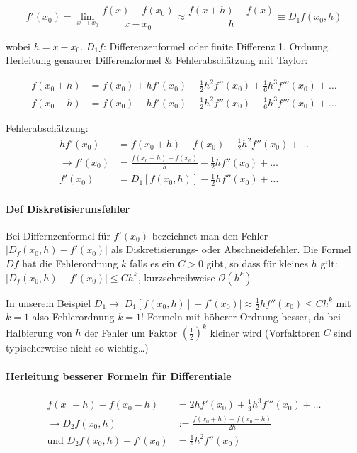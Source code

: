 \documentclass[a4paper,ngerman]{scrbook}
\newcommand{\bO}{\ensuremath{\mathcal{O}}}%
\begin{document}
\[
f'(x_0) = \lim\limits_{x\to x_0} \frac{f(x) - f(x_0)}{x-x_0} \approx \frac{f(x+h) - f(x)}{h} \equiv D_1f(x_0,h)
\]

 wobei $h = x - x_0$. $D_1f$: Differenzenformel oder finite Differenz 1\@. Ordnung. Herleitung genaurer Differenzformel \& Fehlerabschätzung mit Taylor:

\begin{align*}
  f(x_0 + h) &= f(x_0) + hf'(x_0) + \frac{1}{2} h^2 f''(x_0) +     \frac{1}{6} h^3 f'''(x_0)+ \dots\\
f(x_0 - h) &= f(x_0) - hf'(x_0) + \frac{1}{2} h^2 f''(x_0) -     \frac{1}{6} h^3 f'''(x_0)+ \dots
\end{align*}

Fehlerabschätzung:
\begin{align*}
  hf'(x_0) &= f(x_0 + h) - f(x_0) - \frac{1}{2}h^2 f''(x_0) + \dots\\
  \to f'(x_0) &= \frac{f(x_0 + h) - f(x_0)}{h} - \frac{1}{2} h f''(x_0)+\dots\\
f'(x_0) &= D_1 [f(x_0, h)] - \frac{1}{2}hf''(x_0) + \dots
\end{align*}

\paragraph{Def Diskretisierunsfehler}

Bei Differnzenformel für $f'(x_0)$ bezeichnet man den Fehler $| D_f(x_0, h) - f'(x_0) |$ als Diskretisierungs- oder Abschneidefehler. Die Formel $Df$ hat die Fehlerordnung $k$ falls es ein $C > 0$ gibt, so dass für kleines $h$ gilt: $|D_f(x_0, h) - f'(x_0)|\leq Ch^k$, kurzschreibweise $\bO(h^k)$

In unserem Beispiel $D_1 \to |D_1[f(x_0,h)] - f'(x_0)| \approx \frac{1}{2} h f''(x_0) \leq Ch^k$ mit $k=1$ also Fehlerordnung $k=1$! Formeln mit höherer Ordnung besser, da bei Halbierung von $h$ der Fehler um Faktor $(\frac{1}{2})^k$ kleiner wird (Vorfaktoren $C$ sind typischerweise nicht so wichtig\dots)

\paragraph{Herleitung besserer Formeln für Differentiale}

\begin{align*}
  f(x_0 + h) - f(x_0 - h) &= 2 h f'(x_0) + \frac{1}{3} h^3 f'''(x_0) + \dots\\
\to D_2 f(x_0,h) &:= \frac{f(x_0+h) - f(x_0-h)}{2h}\\
\text{und } D_2f(x_0,h) - f'(x_0) &= \frac{1}{6}h^2f''(x_0)
\end{align*}
\end{document}
